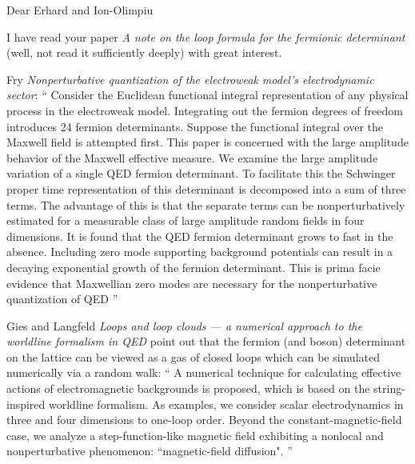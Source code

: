 \begin{description}
\bigskip

Dear Erhard and Ion-Olimpiu

I have read your paper
{\em A note on the loop formula for the fermionic determinant}
(well, not read it sufficiently deeply)
with great interest.

\item[2017-09-17 Predrag]
Fry {\em Nonperturbative quantization of the electroweak model's
electrodynamic sector}: `` Consider the Euclidean functional integral
representation of any physical process in the electroweak model. Integrating
out the fermion degrees of freedom introduces 24 fermion determinants.
Suppose the functional integral over the Maxwell field is attempted first.
This paper is concerned with the large amplitude behavior of the Maxwell
effective measure. We examine the large amplitude variation of a single QED
fermion determinant. To facilitate this the Schwinger proper time
representation of this determinant is decomposed into a sum of three terms.
The advantage of this is that the separate terms can be nonperturbatively
estimated for a measurable class of large amplitude random fields in four
dimensions. It is found that the QED fermion determinant grows to fast in the
absence. Including zero mode supporting background potentials can result in a
decaying exponential growth of the fermion determinant. This is prima facie
evidence that Maxwellian zero modes are necessary for the nonperturbative
quantization of QED
''

Gies and Langfeld {\em Loops and loop clouds — a numerical
approach to the worldline formalism in {QED}}
point out that the fermion (and boson) determinant on the lattice can be
viewed as a gas of closed loops which can be simulated numerically via a
random walk: ``
A numerical technique for calculating effective actions of electromagnetic
backgrounds is proposed, which is based on the string-inspired worldline
formalism. As examples, we consider scalar electrodynamics in three and four
dimensions to one-loop order. Beyond the constant-magnetic-field case, we
analyze a step-function-like magnetic field exhibiting a nonlocal and
nonperturbative phenomenon: ``magnetic-field diffusion".
''



\end{description}
